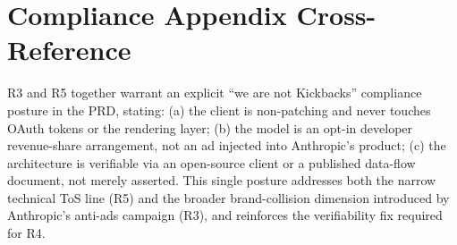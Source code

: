 \section{Compliance Appendix Cross-Reference}
\label{sec:risk-compliance}

R3 and R5 together warrant an explicit ``we are not Kickbacks'' compliance posture in the PRD, stating: (a) the client is non-patching and never touches OAuth tokens or the rendering layer; (b) the model is an opt-in developer revenue-share arrangement, not an ad injected into Anthropic's product; (c) the architecture is verifiable via an open-source client or a published data-flow document, not merely asserted. This single posture addresses both the narrow technical ToS line (R5) and the broader brand-collision dimension introduced by Anthropic's anti-ads campaign (R3), and reinforces the verifiability fix required for R4.
